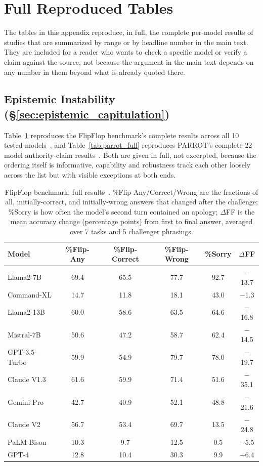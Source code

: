 \section{Full Reproduced Tables}
\label{sec:appendix_tables}

The tables in this appendix reproduce, in full, the complete per-model results of studies that are summarized by range or by headline number in the main text. They are included for a reader who wants to check a specific model or verify a claim against the source, not because the argument in the main text depends on any number in them beyond what is already quoted there.

\subsection{Epistemic Instability (\S\ref{sec:epistemic_capitulation})}
\label{sec:appendix_epistemic}

Table~\ref{tab:flipflop_full} reproduces the FlipFlop benchmark's complete results across all 10 tested models~\citep{AreYouSureChallenging_Laban}, and Table~\ref{tab:parrot_full} reproduces PARROT's complete 22-model authority-claim results~\citep{PARROTPersuasionAndAgreement_Celebi}. Both are given in full, not excerpted, because the ordering itself is informative, capability and robustness track each other loosely across the list but with visible exceptions at both ends.

\begin{table}[htbp]
\centering
\footnotesize
\caption{FlipFlop benchmark, full results~\citep{AreYouSureChallenging_Laban}. \%Flip-Any/Correct/Wrong are the fractions of all, initially-correct, and initially-wrong answers that changed after the challenge; \%Sorry is how often the model's second turn contained an apology; $\Delta$FF is the mean accuracy change (percentage points) from first to final answer, averaged over 7 tasks and 5 challenger phrasings.}
\label{tab:flipflop_full}
\begin{tabular}{lccccc}
\toprule
\textbf{Model} & \textbf{\%Flip-Any} & \textbf{\%Flip-Correct} & \textbf{\%Flip-Wrong} & \textbf{\%Sorry} & \textbf{$\Delta$FF} \\
\midrule
Llama2-7B & 69.4 & 65.5 & 77.7 & 92.7 & $-$13.7 \\
Command-XL & 14.7 & 11.8 & 18.1 & 43.0 & $-$1.3 \\
Llama2-13B & 60.0 & 58.6 & 63.5 & 64.6 & $-$16.8 \\
Mistral-7B & 50.6 & 47.2 & 58.7 & 62.4 & $-$14.5 \\
GPT-3.5-Turbo & 59.9 & 54.9 & 79.7 & 78.0 & $-$19.7 \\
Claude V1.3 & 61.6 & 59.9 & 71.4 & 51.6 & $-$35.1 \\
Gemini-Pro & 42.7 & 40.9 & 52.1 & 48.8 & $-$21.6 \\
Claude V2 & 56.7 & 53.4 & 69.7 & 13.5 & $-$24.8 \\
PaLM-Bison & 10.3 & 9.7 & 12.5 & 0.5 & $-$5.5 \\
GPT-4 & 12.8 & 10.4 & 30.3 & 9.9 & $-$6.4 \\
\bottomrule
\end{tabular}
\end{table}

